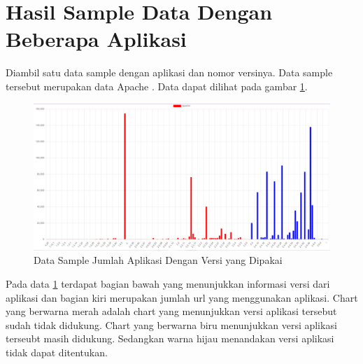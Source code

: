 \section{Hasil Sample Data Dengan Beberapa Aplikasi}
Diambil satu data sample dengan aplikasi dan nomor versinya. Data sample tersebut merupakan data Apache . Data dapat dilihat pada gambar \ref{fig:data_sample_res}.
\begin{figure}[H]
\centering  
\includegraphics[scale=0.4]{Gambar/apache.PNG}  
\caption{Data Sample Jumlah Aplikasi Dengan Versi yang Dipakai} 
\label{fig:data_sample_res} 
\end{figure}
Pada data \ref{fig:data_sample_res} terdapat bagian bawah yang menunjukkan informasi versi dari aplikasi dan bagian kiri merupakan jumlah url yang menggunakan aplikasi. Chart yang berwarna merah adalah chart yang menunjukkan versi aplikasi tersebut sudah tidak didukung. Chart yang berwarna biru menunjukkan versi aplikasi terseubt masih didukung. Sedangkan warna hijau menandakan versi aplikasi tidak dapat ditentukan.